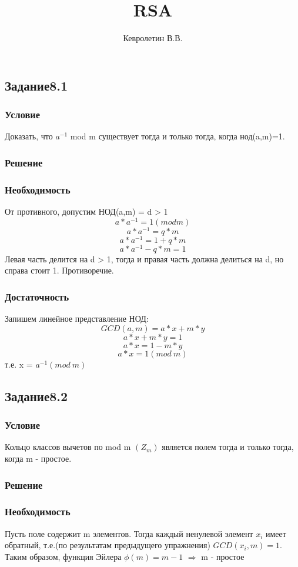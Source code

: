 \documentclass[10pt,a4paper]{article}
\author{Кевролетин В.В.}
\title{RSA}
\begin{document}
\maketitle

\subsection*{Задание8.1}
\subsubsection*{Условие}
Доказать, что $a^{-1}$ mod m существует тогда и только тогда, когда
нод(a,m)=1.
\subsubsection*{Решение}
\subsubsection*{Необходимость}
От противного, допустим  НОД(a,m) = d > 1
$$ a*a^{-1} = 1 (mod m) $$
$$ a*a^{-1} = q*m $$
$$ a*a^{-1} = 1 + q*m $$
$$ a*a^{-1} - q*m = 1 $$
Левая часть делится на d > 1, тогда и правая часть должна делиться на
d, но справа стоит 1. Противоречие.
\subsubsection*{Достаточность}
Запишем линейное представление НОД:
$$ GCD(a, m) = a*x + m*y $$
$$ a*x + m*y = 1 $$
$$ a*x = 1 - m*y $$
$$ a*x = 1 (mod\ m) $$
т.е. x = $a^{-1} (mod\ m)$

\subsection*{Задание8.2}
\subsubsection*{Условие}
Кольцо классов вычетов по mod m $(Z_m)$ является полем тогда и только
тогда, когда m - простое.
\subsubsection*{Решение}
\subsubsection*{Необходимость}
Пусть поле содержит m элементов. Тогда каждый ненулевой элемент $x_i$
имеет обратный, т.е.(по результатам предыдущего упражнения) $GCD(x_i,m)
= 1$. Таким образом, функция Эйлера 
$\phi (m) = m-1$ $\Rightarrow$ m - простое
\end{document}
